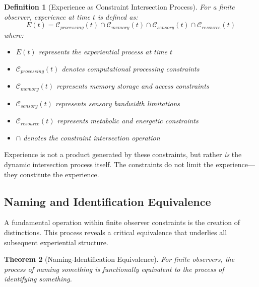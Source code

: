 \documentclass{article}
\newtheorem{theorem}{Theorem}[section]
\newtheorem{definition}[theorem]{Definition}
\begin{document}
\begin{definition}[Experience as Constraint Intersection Process]
For a finite observer, experience at time $t$ is defined as:
\begin{equation}
E(t) = \mathcal{C}_{processing}(t) \cap \mathcal{C}_{memory}(t) \cap \mathcal{C}_{sensory}(t) \cap \mathcal{C}_{resource}(t)
\end{equation}
where:
\begin{itemize}
\item $E(t)$ represents the experiential process at time $t$
\item $\mathcal{C}_{processing}(t)$ denotes computational processing constraints
\item $\mathcal{C}_{memory}(t)$ represents memory storage and access constraints  
\item $\mathcal{C}_{sensory}(t)$ represents sensory bandwidth limitations
\item $\mathcal{C}_{resource}(t)$ represents metabolic and energetic constraints
\item $\cap$ denotes the constraint intersection operation
\end{itemize}
\end{definition}

Experience is not a product generated by these constraints, but rather \textit{is} the dynamic intersection process itself. The constraints do not limit the experience—they constitute the experience.

\subsection{Naming and Identification Equivalence}

A fundamental operation within finite observer constraints is the creation of distinctions. This process reveals a critical equivalence that underlies all subsequent experiential structure.

\begin{theorem}[Naming-Identification Equivalence]
For finite observers, the process of naming something is functionally equivalent to the process of identifying something.
\end{theorem}
\end{document}
